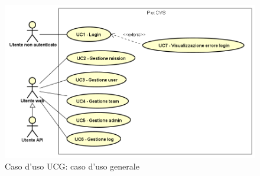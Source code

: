        \begin{figure}[H]
            \centering
            \includegraphics[scale=0.95, width=\textwidth]{immagini/usecase/UCG.png}
            \caption{Caso d'uso UCG: caso d'uso generale}\label{fig:UCG} 
        \end{figure}
